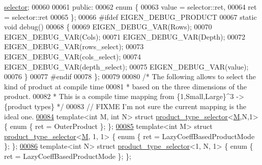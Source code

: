 \begin{DoxyCode}
       \hyperlink{struct_eigen_1_1internal_1_1product__type__selector}{selector};
00060 
00061 \textcolor{keyword}{public}:
00062   \textcolor{keyword}{enum} \{
00063     value = selector::ret,
00064     ret = selector::ret
00065   \};
00066 \textcolor{preprocessor}{#ifdef EIGEN\_DEBUG\_PRODUCT}
00067   \textcolor{keyword}{static} \textcolor{keywordtype}{void} debug()
00068   \{
00069       EIGEN\_DEBUG\_VAR(Rows);
00070       EIGEN\_DEBUG\_VAR(Cols);
00071       EIGEN\_DEBUG\_VAR(Depth);
00072       EIGEN\_DEBUG\_VAR(rows\_select);
00073       EIGEN\_DEBUG\_VAR(cols\_select);
00074       EIGEN\_DEBUG\_VAR(depth\_select);
00075       EIGEN\_DEBUG\_VAR(value);
00076   \}
00077 \textcolor{preprocessor}{#endif}
00078 \};
00079 
00080 \textcolor{comment}{/* The following allows to select the kind of product at compile time}
00081 \textcolor{comment}{ * based on the three dimensions of the product.}
00082 \textcolor{comment}{ * This is a compile time mapping from \{1,Small,Large\}^3 -> \{product types\} */}
00083 \textcolor{comment}{// FIXME I'm not sure the current mapping is the ideal one.}
\hyperlink{struct_eigen_1_1internal_1_1product__type__selector_3_01_m_00_01_n_00_011_01_4}{00084} \textcolor{keyword}{template}<\textcolor{keywordtype}{int} M, \textcolor{keywordtype}{int} N>  \textcolor{keyword}{struct }\hyperlink{struct_eigen_1_1internal_1_1product__type__selector}{product\_type\_selector}<\hyperlink{group___core___module_class_eigen_1_1_matrix}{M},N,1>              \{ \textcolor{keyword}{enum} \{ ret
       = OuterProduct \}; \};
\hyperlink{struct_eigen_1_1internal_1_1product__type__selector_3_01_m_00_011_00_011_01_4}{00085} \textcolor{keyword}{template}<\textcolor{keywordtype}{int} M>         \textcolor{keyword}{struct }\hyperlink{struct_eigen_1_1internal_1_1product__type__selector}{product\_type\_selector}<\hyperlink{group___core___module_class_eigen_1_1_matrix}{M}, 1, 1>            \{ \textcolor{keyword}{enum} \{ ret
       = LazyCoeffBasedProductMode \}; \};
\hyperlink{struct_eigen_1_1internal_1_1product__type__selector_3_011_00_01_n_00_011_01_4}{00086} \textcolor{keyword}{template}<\textcolor{keywordtype}{int} N>         \textcolor{keyword}{struct }\hyperlink{struct_eigen_1_1internal_1_1product__type__selector}{product\_type\_selector}<1, N, 1>            \{ \textcolor{keyword}{enum} \{ ret 
      = LazyCoeffBasedProductMode \}; \};

\end{DoxyCode}
